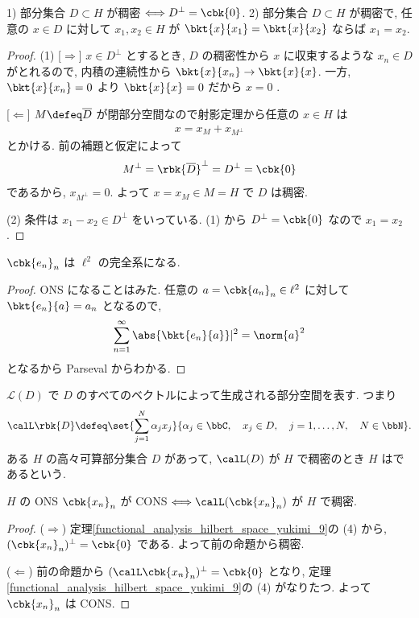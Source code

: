 \documentclass[openany, a4paper, oneside]{jsbook}
\begin{document}
\begin{prop}
 1) 部分集合 $D \subset H$ が稠密 $\Longleftrightarrow D^\perp = \cbk{0}$.
 2) 部分集合 $D \subset H$ が稠密で, 任意の $x \in D$ に対して $x_{1}, x_{2} \in H$ が
    $\bkt{x}{x_1} = \bkt{x}{x_2}$ ならば $x_{1} = x_{2}$.
\end{prop}
\begin{proof}
(1) [$\Longrightarrow$]
$x \in D^\perp$ とするとき, $D$ の稠密性から $x$ に収束するような $x_{n} \in D$ がとれるので,
内積の連続性から $\bkt{x}{x_n} \to \bkt{x}{x}$.
一方, $\bkt{x}{x_n} = 0$ より $\bkt{x}{x} = 0$ だから $x = 0$ .

[$\Longleftarrow$]
$M \defeq \overline{D}$ が閉部分空間なので射影定理から任意の $x \in H$ は
\begin{align}
 x
 =
 x_{M} + x_{M^\perp}
\end{align}
とかける.
前の補題と仮定によって
\begin{align}
 M^\perp
 = \rbk{\overline{D}}^\perp
 =
 D^\perp
 =
 \cbk{0}
\end{align}
であるから, $x_{M^\perp} = 0$.
よって $x = x_{M} \in M = H$ で $D$ は稠密.

(2) 条件は $x_1 - x_2 \in D^\perp$ をいっている.
(1) から $D^\perp = \cbk{0}$ なので $x_1 = x_2$.
\end{proof}

\begin{ex}
 $\cbk{e_n}_n$ は $\ell^2$ の完全系になる.
\end{ex}
\begin{proof}
ONS になることはみた.
任意の $a = \cbk{a_{n}}_n \in \ell^2$ に対して $\bkt{e_n}{a} = a_n$ となるので,
\begin{align}
 \sum_{n=1}^\infty \abs{\bkt{e_n}{a}}|^2
 =
 \norm{a}^2
\end{align}
となるから Parseval からわかる.
\end{proof}

\begin{defn}
 $\mathcal{L}(D)$ で $D$ のすべてのベクトルによって生成される部分空間を表す.
 つまり
 \begin{align}
  \calL \rbk{D}
  \defeq
  \set{\sum_{j=1}^N \alpha_j x_j}{\alpha_j \in \bbC, \quad x_j \in D, \quad j = 1, \dots, N, \quad N \in \bbN}.
 \end{align}
 ある $H$ の高々可算部分集合 $D$ があって, $\calL (D)$ が $H$ で稠密のとき $H$ はであるという.
\end{defn}

\begin{prop}\label{functional_analysis_hilbert_space_yukimi_10}
 $H$ の ONS $\cbk{x_n}_n$ が CONS $\Longleftrightarrow \calL(\cbk{x_n}_n)$ が $H$ で稠密.
\end{prop}
\begin{proof}
($\Longrightarrow$)
定理\ref{functional_analysis_hilbert_space_yukimi_9}の (4) から,
$(\cbk{x_n}_n)^\perp = \cbk{0}$ である.
よって前の命題から稠密.

($\Longleftarrow$)
前の命題から $(\calL \cbk{x_n}_n)^\perp = \cbk{0}$ となり,
定理 \ref{functional_analysis_hilbert_space_yukimi_9}の (4) がなりたつ.
よって $\cbk{x_n}_n$ は CONS.
\end{proof}
\end{document}
